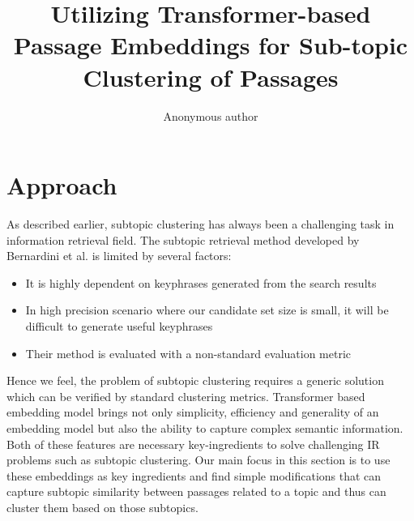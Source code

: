 \documentclass[sigconf,authordraft]{acmart}
\begin{document}
\title{Utilizing Transformer-based Passage Embeddings for Sub-topic Clustering of Passages}


\author{Anonymous author}

\renewcommand{\shortauthors}{}
\maketitle

\section{Approach} As described earlier, subtopic clustering has always been a challenging task in information retrieval field. The subtopic retrieval method developed by Bernardini et al. is limited by several factors: 
\begin{itemize}
    \item It is highly dependent on keyphrases generated from the search results
    \item In high precision scenario where our candidate set size is small, it will be difficult to generate useful keyphrases
    \item Their method is evaluated with a non-standard evaluation metric
\end{itemize}
Hence we feel, the problem of subtopic clustering requires a generic solution which can be verified by standard clustering metrics. Transformer based embedding model brings not only simplicity, efficiency and generality of an embedding model but also the ability to capture complex semantic information. Both of these features are necessary key-ingredients to solve challenging IR problems such as subtopic clustering. Our main focus in this section is to use these embeddings as key ingredients and find simple modifications that can capture subtopic similarity between passages related to a topic and thus can cluster them based on those subtopics.
\end{document}
